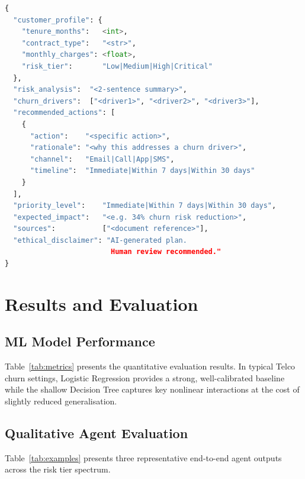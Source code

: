 \documentclass[11pt]{article}
\begin{document}
\begin{lstlisting}[language=Python,
  caption={Structured output schema enforced via the Node 4 prompt.}]
{
  "customer_profile": {
    "tenure_months":   <int>,
    "contract_type":   "<str>",
    "monthly_charges": <float>,
    "risk_tier":       "Low|Medium|High|Critical"
  },
  "risk_analysis":  "<2-sentence summary>",
  "churn_drivers":  ["<driver1>", "<driver2>", "<driver3>"],
  "recommended_actions": [
    {
      "action":    "<specific action>",
      "rationale": "<why this addresses a churn driver>",
      "channel":   "Email|Call|App|SMS",
      "timeline":  "Immediate|Within 7 days|Within 30 days"
    }
  ],
  "priority_level":    "Immediate|Within 7 days|Within 30 days",
  "expected_impact":   "<e.g. 34% churn risk reduction>",
  "sources":           ["<document reference>"],
  "ethical_disclaimer": "AI-generated plan.
                         Human review recommended."
}
\end{lstlisting}

\section{Results and Evaluation}
\label{sec:results}

\subsection{ML Model Performance}

Table~\ref{tab:metrics} presents the quantitative evaluation results.
In typical Telco churn settings, Logistic Regression provides a strong,
well-calibrated baseline while the shallow Decision Tree captures key
nonlinear interactions at the cost of slightly reduced generalisation.

\subsection{Qualitative Agent Evaluation}

Table~\ref{tab:examples} presents three representative end-to-end agent
outputs across the risk tier spectrum.
\end{document}
